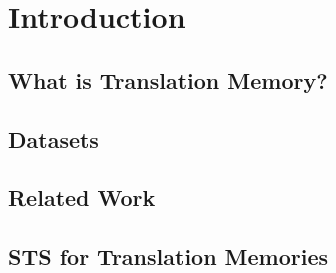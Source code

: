 \chapter{\label{cha:tm_introduction}Introduction}

\section{What is Translation Memory?}
\cite{Arthern1979}
\section{Datasets}

\section{Related Work}

\section{STS for Translation Memories}



